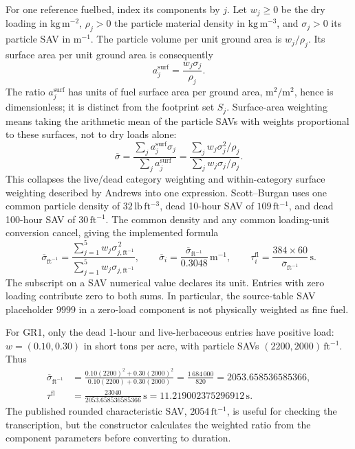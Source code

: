 \documentclass[11pt,a4paper]{article}
\begin{document}
For one reference fuelbed, index its components by $j$. Let $w_j\geq0$ be the
dry loading in $\mathrm{kg\,m^{-2}}$, $\rho_j>0$ the particle material density
in $\mathrm{kg\,m^{-3}}$, and $\sigma_j>0$ its particle SAV in
$\mathrm{m^{-1}}$.
The particle volume per unit ground area is $w_j/\rho_j$. Its surface area per
unit ground area is consequently
\begin{equation}
 a_j^{\mathrm{surf}}=\frac{w_j\sigma_j}{\rho_j}.
 \label{eq:component-surface}
\end{equation}
The ratio $a_j^{\mathrm{surf}}$ has units of fuel surface area per ground
area, $\mathrm{m^2}/\mathrm{m^2}$, hence is dimensionless; it is distinct
from the footprint set $S_j$. Surface-area weighting means taking the arithmetic mean of the particle SAVs
with weights proportional to these surfaces, not to dry loads alone:
\begin{equation}
 \overline\sigma
 =\frac{\sum_j a_j^{\mathrm{surf}}\sigma_j}{\sum_j a_j^{\mathrm{surf}}}
 =\frac{\sum_j w_j\sigma_j^2/\rho_j}
        {\sum_j w_j\sigma_j/\rho_j}.
 \label{eq:characteristic-sav-general}
\end{equation}
This collapses the live/dead category weighting and within-category surface
weighting described by Andrews into one expression.\cite{andrews2018}
Scott--Burgan uses one common particle density of
$32\,\mathrm{lb\,ft^{-3}}$, dead 10-hour SAV of $109\,\mathrm{ft^{-1}}$, and
dead 100-hour SAV of $30\,\mathrm{ft^{-1}}$.\cite{scottburgan2005}
The common density and any common loading-unit conversion cancel, giving the
implemented formula
\begin{equation}
 \overline\sigma_{\mathrm{ft^{-1}}}
 =\frac{\sum_{j=1}^{5}w_j\sigma_{j,\mathrm{ft^{-1}}}^{\,2}}
        {\sum_{j=1}^{5}w_j\sigma_{j,\mathrm{ft^{-1}}}},
 \qquad
 \overline\sigma_i=\frac{\overline\sigma_{\mathrm{ft^{-1}}}}{0.3048}
 \,\mathrm{m^{-1}},
 \qquad
 \tau_i^{\mathrm{fl}}=\frac{384\times60}{\overline\sigma_{\mathrm{ft^{-1}}}}\,\mathrm{s}.
 \label{eq:fbfm-residence}
\end{equation}
The subscript on a SAV numerical value declares its unit. Entries with zero
loading contribute zero to both sums. In particular, the source-table SAV
placeholder $9999$ in a zero-load component is not physically weighted as
fine fuel.

For GR1, only the dead 1-hour and live-herbaceous entries have positive load:
$w=(0.10,0.30)$ in short tons per acre, with particle SAVs
$(2200,2000)\,\mathrm{ft^{-1}}$. Thus
\begin{align}
 \overline\sigma_{\mathrm{ft^{-1}}}
 &=\frac{0.10(2200)^2+0.30(2000)^2}
         {0.10(2200)+0.30(2000)}
   =\frac{1\,684\,000}{820}
   =2053.658536585366,\\
 \tau^{\mathrm{fl}}&=\frac{23040}{2053.658536585366}\,\mathrm{s}
   =11.219002375296912\,\mathrm{s}.
\end{align}
The published rounded characteristic SAV, $2054\,\mathrm{ft^{-1}}$, is useful
for checking the transcription, but the constructor calculates the weighted
ratio from the component parameters before converting to duration.
\end{document}
